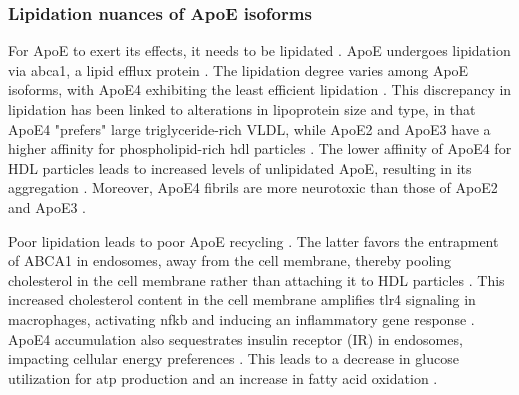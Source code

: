 \documentclass{amsart}
\begin{document}
\subsubsection{Lipidation nuances of ApoE isoforms}
For ApoE to exert its effects, it needs to be lipidated \cite{Husain2021APOETherapeutics}. ApoE undergoes lipidation via \acrfull{abca1}, a lipid efflux protein \cite{Flowers2020APOEBrain, Courtney2016LXRDisease}. The lipidation degree varies among ApoE isoforms, with ApoE4 exhibiting the least efficient lipidation \cite{Hu2015OpposingMice, Heinsinger2016ApolipoproteinFluid}. This discrepancy in lipidation has been linked to alterations in lipoprotein size and type, in that ApoE4 "prefers" large triglyceride-rich VLDL, while ApoE2 and ApoE3 have a higher affinity for phospholipid-rich \acrshort{hdl} particles \cite{Nguyen2010MolecularE4}. The lower affinity of ApoE4 for HDL particles leads to increased levels of unlipidated ApoE, resulting in its aggregation \cite{Hatters2006ApolipoproteinFunction}. Moreover, ApoE4 fibrils are more neurotoxic than those of ApoE2 and ApoE3 \cite{Hatters2006Amino-terminalFibrils}.

Poor lipidation leads to poor ApoE recycling \cite{Yassine2020APOEDisease}. The latter favors the entrapment of ABCA1 in endosomes, away from the cell membrane, thereby pooling cholesterol in the cell membrane rather than attaching it to HDL particles \cite{Rawat2019ApoE4Astrocytes}. This increased cholesterol content in the cell membrane amplifies \acrfull{tlr4} signaling in macrophages, activating \acrshort{nfkb} and inducing an inflammatory gene response \cite{Yassine2020APOEDisease}.  ApoE4 accumulation also sequestrates insulin receptor (IR) in endosomes, impacting cellular energy preferences \cite{Zhao2017ApolipoproteinEndosomes}. This leads to a decrease in glucose utilization for \acrshort{atp} production and an increase in fatty acid oxidation \cite{Svennerholm1997ChangesSwedes}. 
\end{document}
